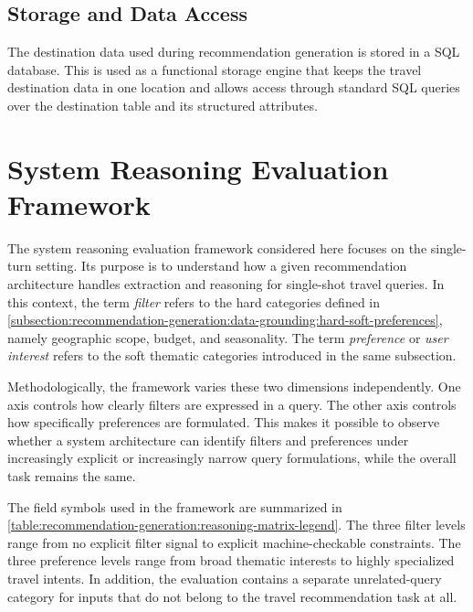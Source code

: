 \subsection{Storage and Data Access}

The destination data used during recommendation generation is stored in a SQL database. This is used as a functional storage engine that keeps the travel destination data in one location and allows access through standard SQL queries over the destination table and its structured attributes.

\section{System Reasoning Evaluation Framework}\label{section:recommendation-generation:reasoning-evaluation-framework}

The system reasoning evaluation framework considered here focuses on the single-turn setting. Its purpose is to understand how a given recommendation architecture handles extraction and reasoning for single-shot travel queries. In this context, the term \emph{filter} refers to the hard categories defined in \autoref{subsection:recommendation-generation:data-grounding:hard-soft-preferences}, namely geographic scope, budget, and seasonality. The term \emph{preference} or \emph{user interest} refers to the soft thematic categories introduced in the same subsection.

Methodologically, the framework varies these two dimensions independently. One axis controls how clearly filters are expressed in a query. The other axis controls how specifically preferences are formulated. This makes it possible to observe whether a system architecture can identify filters and preferences under increasingly explicit or increasingly narrow query formulations, while the overall task remains the same.

The field symbols used in the framework are summarized in \autoref{table:recommendation-generation:reasoning-matrix-legend}. The three filter levels range from no explicit filter signal to explicit machine-checkable constraints. The three preference levels range from broad thematic interests to highly specialized travel intents. In addition, the evaluation contains a separate unrelated-query category for inputs that do not belong to the travel recommendation task at all.

